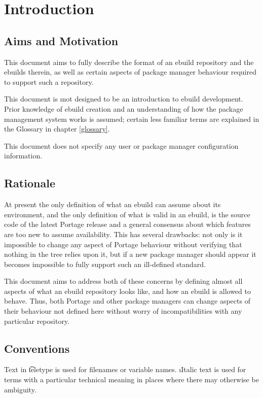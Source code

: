 \chapter{Introduction}

\section{Aims and Motivation}

This document aims to fully describe the format of an ebuild repository and the ebuilds therein, as
well as certain aspects of package manager behaviour required to support such a repository.

This document is \i{not} designed to be an introduction to ebuild development. Prior knowledge of
ebuild creation and an understanding of how the package management system works is assumed; certain
less familiar terms are explained in the Glossary in chapter \ref{glossary}.

This document does not specify any user or package manager configuration information.

\section{Rationale}

At present the only definition of what an ebuild can assume about its environment,
and the only definition of what is valid in an ebuild, is the source code of the latest Portage release
and a general consensus about which features are too new to assume availability. This has several
drawbacks: not only is it impossible to change any aspect of Portage behaviour without verifying
that nothing in the tree relies upon it, but if a new package manager should appear it becomes
impossible to fully support such an ill-defined standard.

This document aims to address both of these concerns by defining almost all aspects of what an
ebuild repository looks like, and how an ebuild is allowed to behave. Thus, both Portage and other
package managers can change aspects of their behaviour not defined here without worry of
incompatibilities with any particular repository.

\section{Conventions}

Text in \t{teletype} is used for filenames or variable names. \i{Italic} text is used for terms
with a particular technical meaning in places where there may otherwise be ambiguity.

